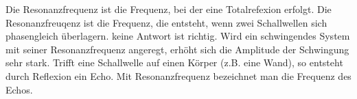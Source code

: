 \documentclass[11pt]{exam}
\begin{document}
\begin{questions}
\begin{choices}
	\choice Die Resonanzfrequenz ist die Frequenz, bei der eine Totalrefexion erfolgt.
	\choice Die Resonanzfreuqenz ist die Frequenz, die entsteht, wenn zwei Schallwellen sich phasengleich überlagern.
	\choice keine Antwort ist richtig.
	\choice Wird ein schwingendes System mit seiner Resonanzfrequenz angeregt, erhöht sich die Amplitude der Schwingung sehr stark.
	\choice Trifft eine Schallwelle auf einen Körper (z.B. eine Wand), so entsteht durch Reflexion ein Echo. Mit Resonanzfrequenz bezeichnet man die Frequenz des Echos.
\end{choices}

\vspace{3mm}\end{questions}
\end{document}
